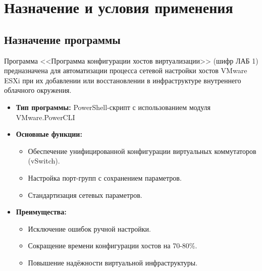 \newpage
\section{Назначение и условия применения}

\subsection{Назначение программы}
Программа <<Программа конфигурации хостов виртуализации>> (шифр ЛАБ 1) предназначена для автоматизации процесса сетевой настройки хостов VMware ESXi при их добавлении или восстановлении в инфраструктуре внутреннего облачного окружения.

\begin{itemize}
    \item \textbf{Тип программы:} PowerShell-скрипт с использованием модуля VMware.PowerCLI
    \item \textbf{Основные функции:}
    \begin{itemize}
        \item Обеспечение унифицированной конфигурации виртуальных коммутаторов (vSwitch).
        \item Настройка порт-групп с сохранением параметров.
        \item Стандартизация сетевых параметров.
    \end{itemize}
    \item \textbf{Преимущества:}
    \begin{itemize}
        \item Исключение ошибок ручной настройки.
        \item Сокращение времени конфигурации хостов на 70-80\%.
        \item Повышение надёжности виртуальной инфраструктуры.
    \end{itemize}
\end{itemize}

